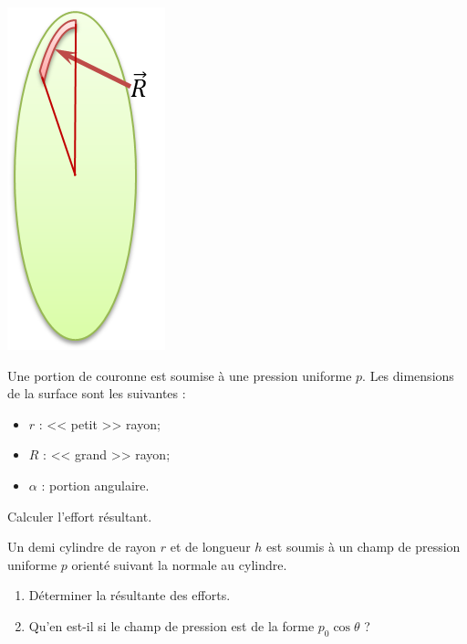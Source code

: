 \documentclass[10pt]{article}
\begin{document}
\begin{exemple}
\begin{minipage}[c]{.3\linewidth}
\begin{center}
\includegraphics[width=.5\textwidth]{images/result_couronne}
\end{center}
\end{minipage}
\hfill
\begin{minipage}[c]{.65\linewidth}
Une portion de couronne est soumise à une pression uniforme $p$. Les dimensions de la surface sont les suivantes : 
\begin{itemize}
\item $r$ : << petit >> rayon;
\item $R$ : << grand >> rayon;
\item $\alpha$ : portion angulaire.
\end{itemize}
Calculer l'effort résultant. 
\end{minipage}

Un demi cylindre de rayon $r$ et de longueur $h$ est soumis à un champ de pression uniforme $p$ orienté suivant la normale au cylindre. 
\begin{enumerate}
\item Déterminer la résultante des efforts. 
\item Qu'en est-il si le champ de pression est de la forme $p_0 \cos \theta$ ?
\end{enumerate}


\end{exemple}
\end{document}
